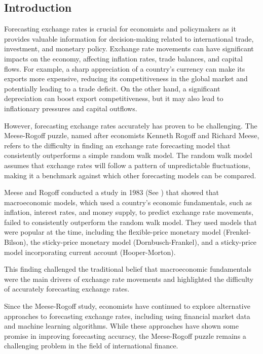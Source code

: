 \documentclass[]{AEA}
\begin{document}
\begin{spacing}{2.0}

\section{Introduction}



Forecasting exchange rates is crucial for economists and policymakers as it provides valuable information for decision-making related to international trade, investment, and monetary policy. Exchange rate movements can have significant impacts on the economy, affecting inflation rates, trade balances, and capital flows. For example, a sharp appreciation of a country's currency can make its exports more expensive, reducing its competitiveness in the global market and potentially leading to a trade deficit. On the other hand, a significant depreciation can boost export competitiveness, but it may also lead to inflationary pressures and capital outflows.

However, forecasting exchange rates accurately has proven to be challenging. The Meese-Rogoff puzzle, named after economists Kenneth Rogoff and Richard Meese, refers to the difficulty in finding an exchange rate forecasting model that consistently outperforms a simple random walk model. The random walk model assumes that exchange rates will follow a pattern of unpredictable fluctuations, making it a benchmark against which other forecasting models can be compared.

Meese and Rogoff conducted a study in 1983 (See \cite{meese1983empirical}) that showed that macroeconomic models, which used a country's economic fundamentals, such as inflation, interest rates, and money supply, to predict exchange rate movements, failed to consistently outperform the random walk model. They used models that were popular at the time, including the flexible-price monetary model (Frenkel-Bilson), the sticky-price monetary model (Dornbusch-Frankel), and a sticky-price model incorporating current account (Hooper-Morton).

This finding challenged the traditional belief that macroeconomic fundamentals were the main drivers of exchange rate movements and highlighted the difficulty of accurately forecasting exchange rates.

Since the Meese-Rogoff study, economists have continued to explore alternative approaches to forecasting exchange rates, including using financial market data and machine learning algorithms. While these approaches have shown some promise in improving forecasting accuracy, the Meese-Rogoff puzzle remains a challenging problem in the field of international finance. 


\end{spacing}
\end{document}
